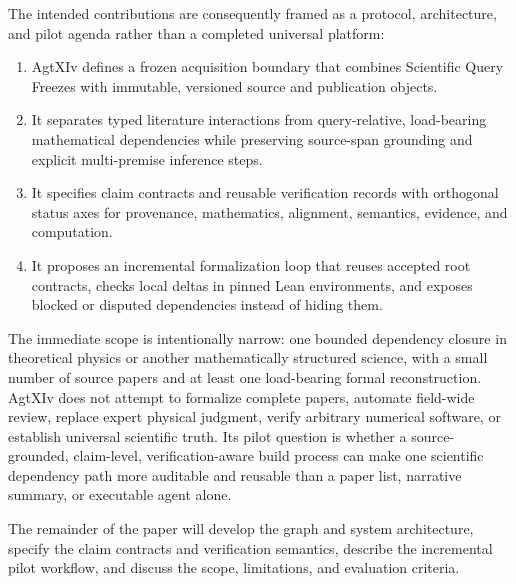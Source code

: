 The intended contributions are consequently framed as a protocol, architecture, and pilot agenda rather than a completed universal platform:
\begin{enumerate}[leftmargin=*]
    \item AgtXIv defines a frozen acquisition boundary that combines Scientific Query Freezes with immutable, versioned source and publication objects.
    \item It separates typed literature interactions from query-relative, load-bearing mathematical dependencies while preserving source-span grounding and explicit multi-premise inference steps.
    \item It specifies claim contracts and reusable verification records with orthogonal status axes for provenance, mathematics, alignment, semantics, evidence, and computation.
    \item It proposes an incremental formalization loop that reuses accepted root contracts, checks local deltas in pinned Lean environments, and exposes blocked or disputed dependencies instead of hiding them.
\end{enumerate}

The immediate scope is intentionally narrow: one bounded dependency closure in theoretical physics or another mathematically structured science, with a small number of source papers and at least one load-bearing formal reconstruction. AgtXIv does not attempt to formalize complete papers, automate field-wide review, replace expert physical judgment, verify arbitrary numerical software, or establish universal scientific truth. Its pilot question is whether a source-grounded, claim-level, verification-aware build process can make one scientific dependency path more auditable and reusable than a paper list, narrative summary, or executable agent alone.

The remainder of the paper will develop the graph and system architecture, specify the claim contracts and verification semantics, describe the incremental pilot workflow, and discuss the scope, limitations, and evaluation criteria.

\fi
